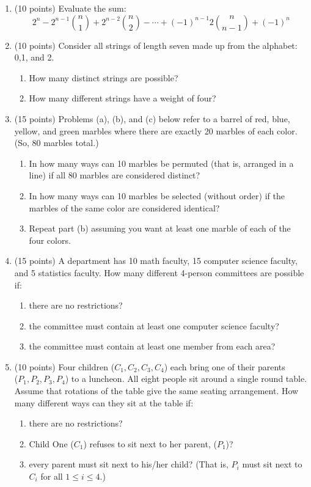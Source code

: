 {\begin{enumerate}
\item (10 points) Evaluate the sum:
$$2^n -2^{n-1}{n \choose 1}+2^{n-2}{n \choose 2}- \cdots +(-1)^{n-1}2{n \choose n-1}+(-1)^n$$
\vfill
\newpage

\item (10 points) Consider all strings of length seven made up from the
alphabet: 0,1, and 2. \begin{enumerate} \item How many distinct strings are possible?
\vfill \item How many different strings have a weight of four? \vfill\end{enumerate}


\item (15 points) Problems (a), (b), and (c) below refer to a barrel
of red, blue, yellow, and green marbles where there are exactly 20
marbles of each color. (So, 80 marbles total.) \begin{enumerate}
\item In how many ways can 10 marbles be permuted (that is, arranged in a line)
 if all 80 marbles
are considered distinct?\vfill
\item In how many ways can 10 marbles be selected (without order) if
the marbles of the same color are considered identical? \vfill
\item Repeat part (b) assuming you want at least one marble of each of the four colors.
\vfill\end{enumerate}
\newpage

\item (15 points) A department has 10 math faculty, 15 computer science faculty,
and 5 statistics faculty. How many different 4-person committees are possible if:
\begin{enumerate} \item there are no restrictions? \vfill
\item the committee must contain at least one computer science faculty? \vfill
\item the committee must contain at least one member from each area? \vfill \end{enumerate}

\item (10 points) Four children ($C_1,C_2,C_3,C_4$) each bring one of their
parents\\
\noindent ($P_1,P_2,P_3,P_4$) to a luncheon. All eight people sit
around a single round table. Assume that rotations of the table give
the same seating arrangement. How many different ways can they sit
at the table if:\begin{enumerate}
\item there are no restrictions? \vfill
\item Child One ($C_1$) refuses to sit next to her parent, ($P_1$)?\vfill
\item every parent must sit next to his/her child? (That is,
$P_i$ must sit next to $C_i$ for all $1 \leq i \leq 4.$)\vfill\end{enumerate}

\end{enumerate}
}
